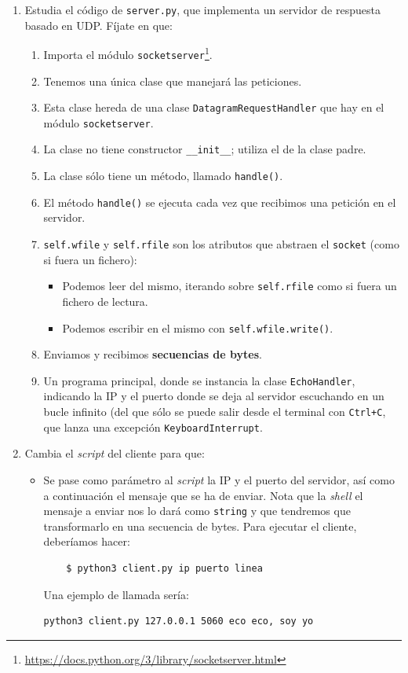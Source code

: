 \documentclass[11pt,a4paper]{article}
\begin{document}
\begin{enumerate}
  \item Estudia el código de \texttt{server.py}, que implementa un servidor de respuesta basado en UDP. Fíjate en que:
  \begin{enumerate}
    \item Importa el módulo \texttt{socketserver}\footnote{\url{https://docs.python.org/3/library/socketserver.html}}.
    \item Tenemos una única clase que manejará las peticiones.
    \item Esta clase hereda de una clase \texttt{DatagramRequestHandler} que hay en el módulo \texttt{socketserver}.
    \item La clase no tiene constructor \texttt{\_\_init\_\_}; utiliza el de la clase padre.
    \item La clase sólo tiene un método, llamado \texttt{handle()}.
    \item El método \texttt{handle()} se ejecuta cada vez que recibimos una petición en el servidor.
    \item \texttt{self.wfile} y \texttt{self.rfile} son los atributos que abstraen el \texttt{socket} (como si fuera un fichero):
    \begin{itemize}
      \item Podemos leer del mismo, iterando sobre \texttt{self.rfile} como si fuera un fichero de lectura.
      \item Podemos escribir en el mismo con \texttt{self.wfile.write()}.
    \end{itemize}
    \item Enviamos y recibimos {\bf secuencias de bytes}. 
    \item Un programa principal, donde se instancia la clase \texttt{EchoHandler}, indicando la IP y el puerto donde se deja al servidor escuchando en un bucle infinito (del que sólo se puede salir desde el terminal con \texttt{Ctrl+C}, que lanza una excepción \texttt{KeyboardInterrupt}.
  \end{enumerate}

  \item Cambia el \emph{script} del cliente para que:
  \begin{itemize}
    \item Se pase como parámetro al \emph{script} la IP y el puerto del servidor, así como a continuación el mensaje que se ha de enviar. Nota que la \emph{shell} el mensaje a enviar nos lo dará como \texttt{string} y que tendremos que transformarlo en una secuencia de bytes. Para ejecutar el cliente, deberíamos hacer:
    \begin{verbatim}
	$ python3 client.py ip puerto linea
    \end{verbatim}
  Una ejemplo de llamada sería: 
\begin{verbatim}
python3 client.py 127.0.0.1 5060 eco eco, soy yo
\end{verbatim}
  \end{itemize}


\end{enumerate}
\end{document}
